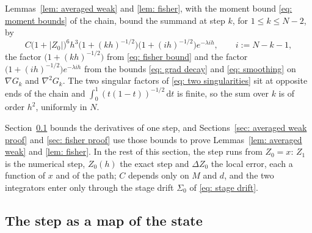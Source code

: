\documentclass[namedate,webpdf,imanum]{ima-authoring-template}
\newcommand{\Le}{\leqslant}
\newcommand{\D}{\mathrm{d}}
\theoremstyle{thmstyletwo}
\numberwithin{equation}{section}
\begin{document}
Lemmas~\ref{lem: averaged weak} and \ref{lem: fisher}, with the moment bound \eqref{eq: moment bounds} of the chain, bound the summand at step $k$, for $1 \Le k \Le N-2$, by
\begin{equation}
    C \bigl( 1 + |Z_0| \bigr)^{6} h^3 \bigl( 1 + (kh)^{-1/2} \bigr) \bigl( 1 + (ih)^{-1/2} \bigr) e^{-\lambda i h} , \qquad i := N - k - 1 ,
    \label{eq: two singularities}
\end{equation}
the factor $\bigl( 1 + (kh)^{-1/2} \bigr)$ from \eqref{eq: fisher bound} and the factor $\bigl( 1 + (ih)^{-1/2} \bigr) e^{-\lambda i h}$ from the bounds \eqref{eq: grad decay} and \eqref{eq: smoothing} on $\nabla G_k$ and $\nabla^2 G_k$. The two singular factors of \eqref{eq: two singularities} sit at opposite ends of the chain and $\int_0^1 (t(1-t))^{-1/2}\,\D t$ is finite, so the sum over $k$ is of order $h^2$, uniformly in $N$.

Section~\ref{sec: step map proof} bounds the derivatives of one step, and Sections~\ref{sec: averaged weak proof} and \ref{sec: fisher proof} use those bounds to prove Lemmas~\ref{lem: averaged weak} and \ref{lem: fisher}. In the rest of this section, the step runs from $Z_0 = x$: $Z_1$ is the numerical step, $Z_0(h)$ the exact step and $\Delta Z_0$ the local error, each a function of $x$ and of the path; $C$ depends only on $M$ and $d$, and the two integrators enter only through the stage drift $\Sigma_0$ of \eqref{eq: stage drift}.

\subsection{The step as a map of the state}
\label{sec: step map proof}
\end{document}
